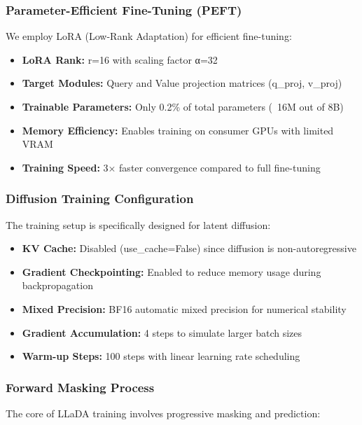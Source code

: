 \documentclass[a4paper,12pt]{article}
\begin{document}
\subsubsection*{Parameter-Efficient Fine-Tuning (PEFT)}
We employ LoRA (Low-Rank Adaptation) for efficient fine-tuning:

\begin{itemize}
    \item \textbf{LoRA Rank:} r=16 with scaling factor α=32
    \item \textbf{Target Modules:} Query and Value projection matrices (q\_proj, v\_proj)
    \item \textbf{Trainable Parameters:} Only 0.2\% of total parameters (~16M out of 8B)
    \item \textbf{Memory Efficiency:} Enables training on consumer GPUs with limited VRAM
    \item \textbf{Training Speed:} 3× faster convergence compared to full fine-tuning
\end{itemize}

\subsubsection*{Diffusion Training Configuration}
The training setup is specifically designed for latent diffusion:

\begin{itemize}
    \item \textbf{KV Cache:} Disabled (use\_cache=False) since diffusion is non-autoregressive
    \item \textbf{Gradient Checkpointing:} Enabled to reduce memory usage during backpropagation
    \item \textbf{Mixed Precision:} BF16 automatic mixed precision for numerical stability
    \item \textbf{Gradient Accumulation:} 4 steps to simulate larger batch sizes
    \item \textbf{Warm-up Steps:} 100 steps with linear learning rate scheduling
\end{itemize}

\subsubsection*{Forward Masking Process}
The core of LLaDA training involves progressive masking and prediction:
\end{document}
